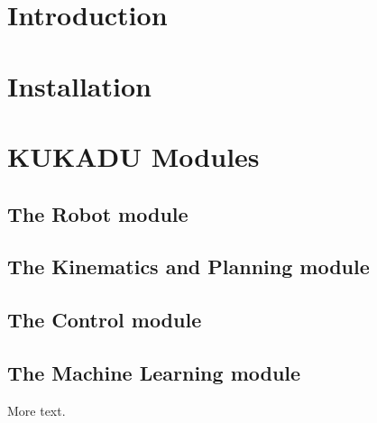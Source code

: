 \hypertarget{KUKADU_introduction}{}\section{Introduction}\label{KUKADU_introduction}
\hypertarget{KUKADU_installation}{}\section{Installation}\label{KUKADU_installation}
\hypertarget{KUKADU_modules}{}\section{K\-U\-K\-A\-D\-U Modules}\label{KUKADU_modules}
\hypertarget{KUKADU_robot}{}\subsection{The Robot module}\label{KUKADU_robot}
\hypertarget{KUKADU_kinematics}{}\subsection{The Kinematics and Planning module}\label{KUKADU_kinematics}
\hypertarget{KUKADU_control}{}\subsection{The Control module}\label{KUKADU_control}
\hypertarget{KUKADU_ml}{}\subsection{The Machine Learning module}\label{KUKADU_ml}
More text. 